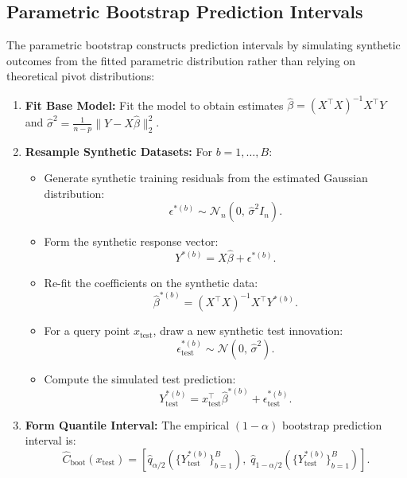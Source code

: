 \documentclass[journal]{IEEEtran}
\begin{document}
\subsection{Parametric Bootstrap Prediction Intervals}
The parametric bootstrap constructs prediction intervals by simulating synthetic outcomes from the fitted parametric distribution rather than relying on theoretical pivot distributions:
\begin{enumerate}
    \item \textbf{Fit Base Model:} Fit the model to obtain estimates $\hat{\beta} = (X^\top X)^{-1} X^\top Y$ and $\hat{\sigma}^2 = \frac{1}{n-p} \|Y - X\hat{\beta}\|_2^2$.
    \item \textbf{Resample Synthetic Datasets:} For $b = 1, \dots, B$:
    \begin{itemize}
        \item Generate synthetic training residuals from the estimated Gaussian distribution:
        \begin{equation}
        \epsilon^{*(b)} \sim \mathcal{N}_n(0, \, \hat{\sigma}^2 I_n).
        \end{equation}
        \item Form the synthetic response vector:
        \begin{equation}
        Y^{*(b)} = X \hat{\beta} + \epsilon^{*(b)}.
        \end{equation}
        \item Re-fit the coefficients on the synthetic data:
        \begin{equation}
        \hat{\beta}^{*(b)} = (X^\top X)^{-1} X^\top Y^{*(b)}.
        \end{equation}
        \item For a query point $x_{\text{test}}$, draw a new synthetic test innovation:
        \begin{equation}
        \epsilon_{\text{test}}^{*(b)} \sim \mathcal{N}(0, \, \hat{\sigma}^2).
        \end{equation}
        \item Compute the simulated test prediction:
        \begin{equation}
        Y_{\text{test}}^{*(b)} = x_{\text{test}}^\top \hat{\beta}^{*(b)} + \epsilon_{\text{test}}^{*(b)}.
        \end{equation}
    \end{itemize}
    \item \textbf{Form Quantile Interval:} The empirical $(1 - \alpha)$ bootstrap prediction interval is:
    \begin{equation}
    \hat{C}_{\text{boot}}(x_{\text{test}}) = \left[ \hat{q}_{\alpha/2}\left( \{Y_{\text{test}}^{*(b)}\}_{b=1}^B \right), \; \hat{q}_{1-\alpha/2}\left( \{Y_{\text{test}}^{*(b)}\}_{b=1}^B \right) \right].
    \end{equation}
\end{enumerate}
\end{document}
